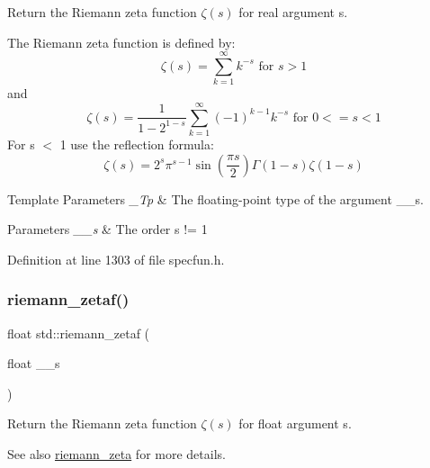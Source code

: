 Return the Riemann zeta function $ \zeta(s) $ for real argument {\ttfamily s}.

The Riemann zeta function is defined by\+: \[ \zeta(s) = \sum_{k=1}^{\infty} k^{-s} \mbox{ for } s > 1 \] and \[ \zeta(s) = \frac{1}{1-2^{1-s}}\sum_{k=1}^{\infty}(-1)^{k-1}k^{-s} \mbox{ for } 0 <= s < 1 \] For s $<$ 1 use the reflection formula\+: \[ \zeta(s) = 2^s \pi^{s-1} \sin(\frac{\pi s}{2}) \Gamma(1-s) \zeta(1-s) \]


\begin{DoxyTemplParams}{Template Parameters}
{\em \+\_\+\+Tp} & The floating-\/point type of the argument {\ttfamily \+\_\+\+\_\+s}. \\
\hline
\end{DoxyTemplParams}

\begin{DoxyParams}{Parameters}
{\em \+\_\+\+\_\+s} & The order {\ttfamily  s != 1 } \\
\hline
\end{DoxyParams}


Definition at line 1303 of file specfun.\+h.

\mbox{\label{group__mathsf__std_gaf92063315061a56d3e2c4053156d968e}} 
\subsubsection{\texorpdfstring{riemann\+\_\+zetaf()}{riemann\_zetaf()}}
{\footnotesize\ttfamily float std\+::riemann\+\_\+zetaf (\begin{DoxyParamCaption}\item[{float}]{\+\_\+\+\_\+s }\end{DoxyParamCaption})\hspace{0.3cm}{\ttfamily [inline]}}

Return the Riemann zeta function $ \zeta(s) $ for {\ttfamily float} argument {\ttfamily s}.

\begin{DoxySeeAlso}{See also}
\hyperlink{group__mathsf__std_gac4ef9d52ee583c77937c3a420b7c72ca}{riemann\+\_\+zeta} for more details. 
\end{DoxySeeAlso}


